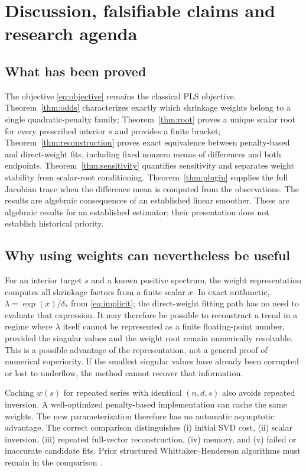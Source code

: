 \section{Discussion, falsifiable claims and research agenda}\label{sec:discussion}

\subsection{What has been proved}
The objective \eqref{eq:objective} remains the classical PLS objective.
Theorem~\ref{thm:odds} characterizes exactly which shrinkage
weights belong to a single quadratic-penalty family;
Theorem~\ref{thm:root} proves a unique scalar root for
every prescribed interior $s$ and provides a finite bracket;
Theorem~\ref{thm:reconstruction} proves exact equivalence
between penalty-based and direct-weight fits, including
fixed nonzero means of differences and both endpoints.
Theorem~\ref{thm:sensitivity} quantifies sensitivity and
separates weight stability from scalar-root conditioning.
Theorem~\ref{thm:plugin} supplies the full Jacobian trace
when the difference mean is computed from the observations.
The results are algebraic consequences of an established
linear smoother. These are algebraic results for an established estimator;
their presentation does not establish historical priority.

\subsection{Why using weights can nevertheless be useful}
For an interior target $s$ and a known positive spectrum,
the weight representation computes all shrinkage factors
from a finite scalar $x$. In exact arithmetic,
$\lambda=\exp(x)/\delta_*$ from \eqref{eq:implicit};
the direct-weight fitting path has no need to evaluate
that expression. It may therefore be possible to
reconstruct a trend in a regime where $\lambda$ itself
cannot be represented as a finite floating-point
number, provided the singular values and the weight
root remain numerically resolvable. This is a possible advantage of the representation,
not a general proof of numerical superiority. If the smallest singular
values have already been corrupted or lost to underflow,
the method cannot recover that information.

Caching $w(s)$ for repeated series with identical $(n,d,s)$
also avoids repeated inversion. A well-optimized penalty-based implementation can cache
the same weights. The new parameterization therefore has
no automatic asymptotic advantage. The correct comparison distinguishes
(i) initial SVD cost, (ii) scalar inversion, (iii) repeated
full-vector reconstruction, (iv) memory, and (v) failed
or inaccurate candidate fits. Prior structured
Whittaker--Henderson algorithms must remain in the
comparison \citep{weinert2007,biessy2026}.

